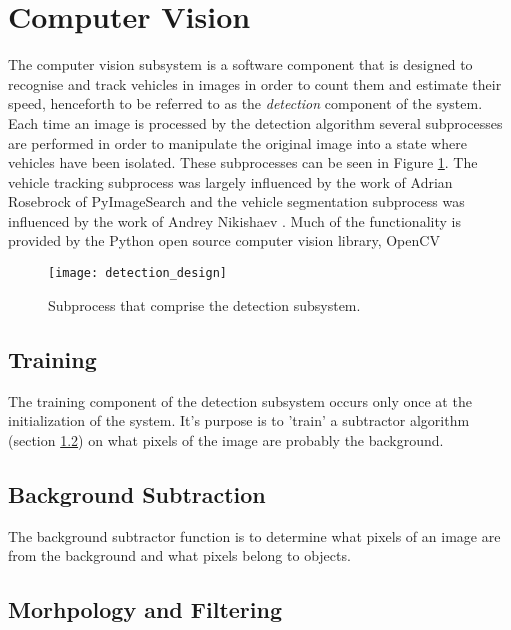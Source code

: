 \section{Computer Vision}

The computer vision subsystem is a software component that is designed to recognise and track vehicles in images in order to count them and estimate their speed, henceforth to be referred to as the \emph{detection} component of the system. Each time an image is processed by the detection algorithm several subprocesses are performed in order to manipulate the original image into a state where vehicles have been isolated. These subprocesses can be seen in Figure \ref{fig:detection_design}. The vehicle tracking subprocess was largely influenced by the work of Adrian Rosebrock \cite{adrian_rosebrock_simple_object_tracking}\cite{adrian_rosebrock_vehicle_tracking} of PyImageSearch and the vehicle segmentation subprocess was influenced by the work of Andrey Nikishaev \cite{andrey_nikishaev_traffic_counting}. Much of the functionality is provided by the Python open source computer vision library, OpenCV \cite{opencv}


\begin{figure}[H]
    \texttt{[image: detection\_design]}
    \caption{Subprocess that comprise the detection subsystem.}
    \label{fig:detection_design}
\end{figure}


\subsection{Training}
\label{subsection:training}
The training component of the detection subsystem occurs only once at the initialization of the system. It's purpose is to 'train' a subtractor algorithm (section \ref{subsection:subtractor}) on what pixels of the image are probably the background. 





\subsection{Background Subtraction}
\label{subsection:subtractor}

The background subtractor function is to determine what pixels of an image are from the background and what pixels belong to objects.


\subsection{Morhpology and Filtering}

